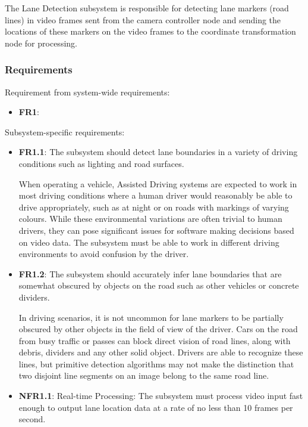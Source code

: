 \documentclass[titlepage,draft]{article}
\begin{document}
The Lane Detection subsystem is responsible for detecting lane markers (road lines) in video frames sent from the camera
controller node and sending the locations of these markers on the video frames to the coordinate transformation node for
processing.

\subsubsection{Requirements}

Requirement from system-wide requirements:

\begin{itemize}
	\item \textbf{FR1}: 
\end{itemize}

Subsystem-specific requirements:
\begin{itemize}
	\item \textbf{FR1.1}: The subsystem should detect lane boundaries in a variety of driving conditions such as lighting and
	      road surfaces.

	      When operating a vehicle, Assisted Driving systems are expected to work in most driving conditions where a human driver
	      would reasonably be able to drive appropriately, such as at night or on roads with markings of varying colours.
	      While these environmental variations are often trivial to human drivers, they can pose significant issues for software
	      making decisions based on video data.
	      The subsystem must be able to work in different driving environments to avoid confusion by the driver.
	\item \textbf{FR1.2}: The subsystem should accurately infer lane boundaries that are somewhat obscured by objects on the
	      road such as other vehicles or concrete dividers.

	      In driving scenarios, it is not uncommon for lane markers to be partially obscured by other objects in the field of view
	      of the driver.
	      Cars on the road from busy traffic or passes can block direct vision of road lines, along with debris, dividers and any
	      other solid object.
	      Drivers are able to recognize these lines, but primitive detection algorithms may not make the distinction that two disjoint
	      line segments on an image belong to the same road line.
	\item \textbf{NFR1.1}: Real-time Processing: The subsystem must process video input fast enough to output lane location data
	      at a rate of no less than 10 frames per second.


\end{itemize}
\end{document}

